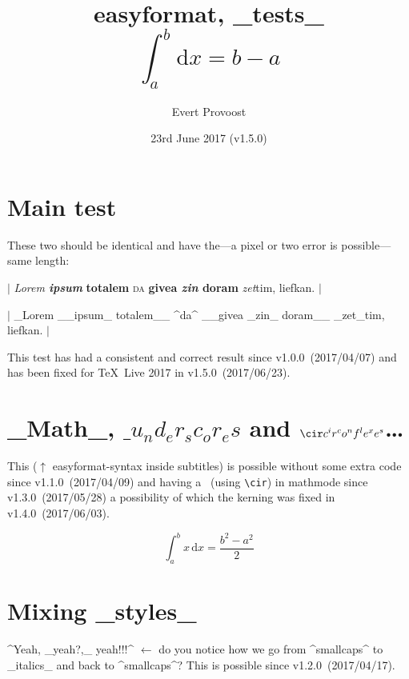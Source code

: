 \documentclass[11pt]{article}
\title{\textsf{easyformat}, _tests_\\$$ \int_a^b \mathrm{d}x = b - a $$}
\author{Evert Provoost}
\date{23rd June 2017 (v1.5.0)}
\begin{document}
	\maketitle
	\tableofcontents

	\section{Main test}
	These two should be identical and have the---a pixel or two error is possible---same length:

	$|$ \textit{Lorem \textbf{ipsum}}\textbf{ totalem} \textsc{da} \textbf{givea \textit{zin} doram}
	\textit{zet}tim, liefkan. $|$

	$|$ _Lorem __ipsum_ totalem__ ^da^ __givea _zin_ doram__ _zet_tim, liefkan. $|$
	
	\noindent This test has had a consistent and correct result since v1.0.0~(2017/04/07) and has been fixed for \TeX~Live 2017 in v1.5.0~(2017/06/23).

	\section{_Math_, $\_ u_nd_er_sc_or_es$ and $\cir c^ir^co^nf^le^xe^s$\dots}
	This ($\uparrow$ \textsf{easyformat}-syntax inside subtitles) is possible without some extra code
	since v1.1.0~(2017/04/09) and having a \cir\ (using \verb|\cir|) in mathmode since
	v1.3.0~(2017/05/28) a possibility of which the kerning was fixed in v1.4.0~(2017/06/03).
	
	$$ \int_a^b x\,\mathrm{d}x = \frac{b^2 - a^2}{2} $$
	
	\section{Mixing _styles_}
	^Yeah, _yeah?,_ yeah!!!^
	$\leftarrow$ do you notice how we go from ^smallcaps^ to _italics_ and back to ^smallcaps^? This
	is possible since v1.2.0~(2017/04/17).
\end{document}
